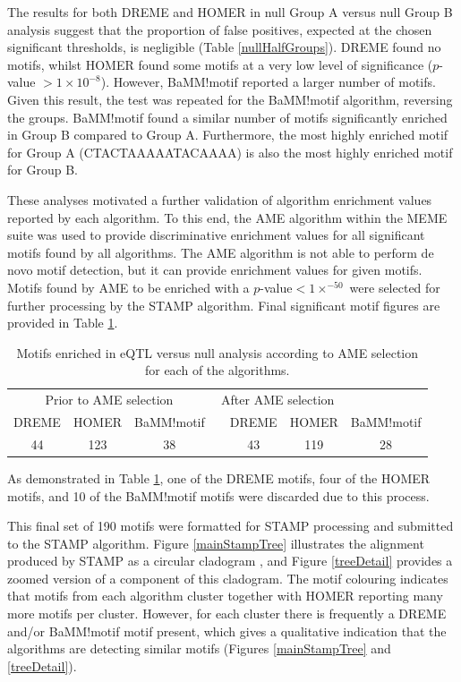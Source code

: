 \documentclass[12pt]{article}
\begin{document}
The results for both DREME and HOMER in null Group A versus null Group B analysis suggest that the proportion of false positives, expected at the chosen significant thresholds, is negligible (Table \ref{nullHalfGroups}). DREME found no motifs, whilst HOMER found some motifs at a very low level of significance ($p$-value $>1\times10^{-8}$). However, BaMM!motif reported a larger number of motifs. Given this result, the test was repeated for the BaMM!motif algorithm, reversing the groups. BaMM!motif found a similar number of motifs significantly enriched in Group B compared to Group A. Furthermore, the most highly enriched motif for Group A (CTACTAAAAATACAAAA) is also the most highly enriched motif for Group B.

These analyses motivated a further validation of algorithm enrichment values reported by each algorithm. To this end, the AME algorithm \citep{Buske2010} within the MEME suite  was used to provide discriminative enrichment values for all significant motifs found by all algorithms. The AME algorithm is not able to perform de novo motif detection, but it can provide enrichment values for given motifs. Motifs found by AME to be enriched with a $p$-value$<1\times^{-50}$ were selected for further processing by the STAMP algorithm. Final significant motif figures are provided in Table \ref{ameResults}.

\begin{table}[!htbp]
\caption{Motifs enriched in eQTL versus null analysis according to AME selection for each of the algorithms.}
\label{ameResults}
\centering
\begin{tabular}{ccccccc}
\toprule[0.2em]
\multicolumn{3}{c}{Prior to AME selection} & \multicolumn{3}{c}{After AME selection}\\
\cmidrule[0.1em]{1-3}
\cmidrule[0.1em]{5-7}
DREME & HOMER & BaMM!motif && DREME & HOMER & BaMM!motif\\
44 & 123 & 38 && 43 & 119 & 28\\
\bottomrule[0.2em]
\end{tabular}
\end{table}


As demonstrated in Table \ref{ameResults}, one of the DREME motifs, four of the HOMER motifs, and 10 of the BaMM!motif motifs were discarded due to this process. 

This final set of 190 motifs were formatted for STAMP processing and submitted to the STAMP algorithm. Figure \ref{mainStampTree} illustrates the alignment produced by STAMP as a circular cladogram \citep{He2016}, and Figure \ref{treeDetail} provides a zoomed version of a component of this cladogram.   The motif colouring indicates that motifs from each algorithm cluster together with HOMER reporting many more motifs per cluster. However, for each cluster
there is frequently a DREME and/or BaMM!motif motif present, which gives a qualitative indication that the algorithms are detecting similar motifs (Figures \ref{mainStampTree} and \ref{treeDetail}).
\end{document}
